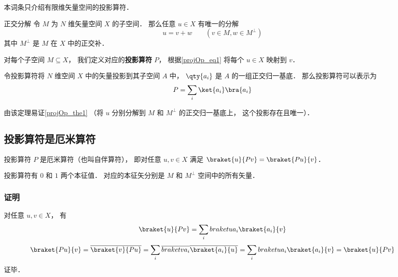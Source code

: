 

本词条只介绍有限维矢量空间的投影算符．

\begin{theorem}{正交分解}\label{projOp_the1}
令 $M$ 为 $N$ 维矢量空间 $X$ 的子空间． 那么任意 $u\in X$ 有唯一的分解
\begin{equation}\label{projOp_eq1}
u = v + w \qquad (v\in M, w\in M^\bot)
\end{equation}
其中 $M^\bot$ 是 $M$ 在 $X$ 中的正交补．
\end{theorem}

对每个子空间 $M\subseteq X$， 我们定义对应的\textbf{投影算符} $P$， 根据\autoref{projOp_eq1} 将每个 $u\in X$ 映射到 $v$．

\begin{theorem}{}
令投影算符将 $N$ 维空间 $X$ 中的矢量投影到其子空间 $A$ 中， $\qty{a_i}$ 是 $A$ 的一组正交归一基底． 那么投影算符可以表示为
\begin{equation}
P = \sum_i \ket{a_i}\bra{a_i}
\end{equation}
\end{theorem}
由该定理易证\autoref{projOp_the1} （将 $u$ 分别分解到 $M$ 和 $M^\bot$ 的正交归一基底上， 这个投影存在且唯一）．



\subsection{投影算符是厄米算符}
投影算符 $P$ 是厄米算符（也叫自伴算符）， 即对任意 $u, v\in X$ 满足 $\braket{u}{Pv} = \braket{Pu}{v}$．

投影算符有 $0$ 和 $1$ 两个本征值． 对应的本征矢分别是 $M$ 和 $M^\bot$ 空间中的所有矢量．

\subsubsection{证明}
对任意 $u, v\in X$， 有
\begin{equation}
\braket{u}{Pv} = \sum_i \\braket{u}{a_i}\braket{a_i}{v}
\end{equation}
\begin{equation}
\braket{Pu}{v} = \overline {\braket{v}{Pu}} = \sum_i \overline{\\braket{v}{a_i}}\overline{\braket{a_i}{u}} = \sum_i \\braket{u}{a_i}\braket{a_i}{v} = \braket{u}{Pv}
\end{equation}
证毕．
